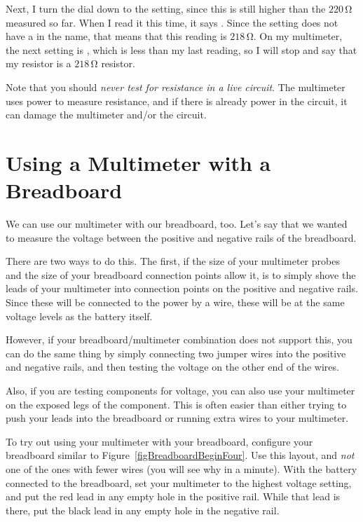 Next, I turn the dial down to the  setting, since this is still higher than the $220\,\si{\ohm}$ measured so far.
When I read it this time, it says .  
Since the setting does not have a  in the name, that means that this reading is $218\,\si{\ohm}$.
On my multimeter, the next setting is , which is less than my last reading, so I will stop and say that my resistor is a $218\,\si{\ohm}$ resistor.

Note that you should \emph{never test for resistance in a live circuit}.
The multimeter uses power to measure resistance, and if there is already power in the circuit, it can damage the multimeter and/or the circuit.

\section{Using a Multimeter with a Breadboard}

We can use our multimeter with our breadboard, too.
Let's say that we wanted to measure the voltage between the positive and negative rails of the breadboard.

There are two ways to do this.
The first, if the size of your multimeter probes and the size of your breadboard connection points allow it, is to simply shove the leads of your multimeter into connection points on the positive and negative rails.
Since these will be connected to the power by a wire, these will be at the same voltage levels as the battery itself.

However, if your breadboard/multimeter combination does not support this, you can do the same thing by simply connecting two jumper wires into the positive and negative rails, and then testing the voltage on the other end of the wires.  

Also, if you are testing components for voltage, you can also use your multimeter on the exposed legs of the component.
This is often easier than either trying to push your leads into the breadboard or running extra wires to your multimeter.

To try out using your multimeter with your breadboard, configure your breadboard similar to Figure~\ref{figBreadboardBeginFour}.  
Use this layout, and \emph{not} one of the ones with fewer wires (you will see why in a minute).
With the battery connected to the breadboard, set your multimeter to the highest voltage setting, and put the red lead in any empty hole in the positive rail.
While that lead is there, put the black lead in any empty hole in the negative rail.

